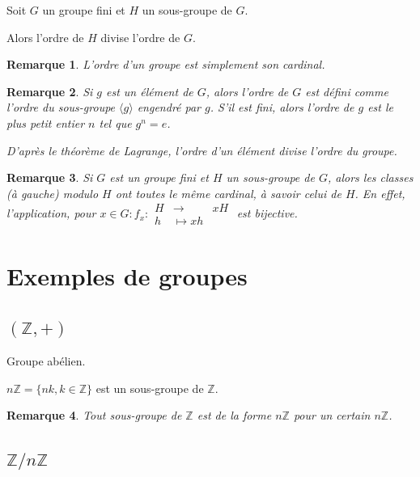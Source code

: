 \documentclass[french]{book}
\newtheorem*{remark}{Remarque}
\begin{document}
\begin{thm}[Lagrange]
  Soit $G$ un groupe fini et $H$ un sous-groupe de $G$.

  Alors l'ordre de $H$ divise l'ordre de $G$.
\end{thm}

\begin{remark}
  L'ordre d'un groupe est simplement son cardinal.
\end{remark}

\begin{remark}
  Si $g$ est un élément de $G$, alors l'ordre de $G$ est défini comme l'ordre du sous-groupe $\langle g \rangle $ engendré par $g$. S'il est fini, alors l'ordre de $g$ est le plus petit entier $n$ tel que $g ^{n} =e$.

  D'après le théorème de Lagrange, l'ordre d'un élément divise l'ordre du groupe.
\end{remark}

\begin{remark}
  Si $G$ est un groupe fini et $H$ un sous-groupe de $G$, alors les classes (à gauche) modulo $H$ ont toutes le même cardinal, à savoir celui de $H$. En effet, l'application, pour $x \in G : f_x:
    \begin{array}{lll}
    H & \longrightarrow & xH \\
    h & \longmapsto xh
    \end{array}$ est bijective.
\end{remark}

\section{Exemples de groupes}

\subsection{$ (\mathbb{Z}, +)$ }

Groupe abélien.

$n \mathbb{Z} = \{ nk, k \in \mathbb{Z} \} $ est un sous-groupe de $\mathbb{Z}$.

\begin{remark}
  Tout sous-groupe de $\mathbb{Z}$ est de la forme $n \mathbb{Z}$ pour un certain $n \mathbb{Z}$.
\end{remark}

\subsection{$\mathbb{Z}/{ n }\mathbb{Z}$}
\end{document}
